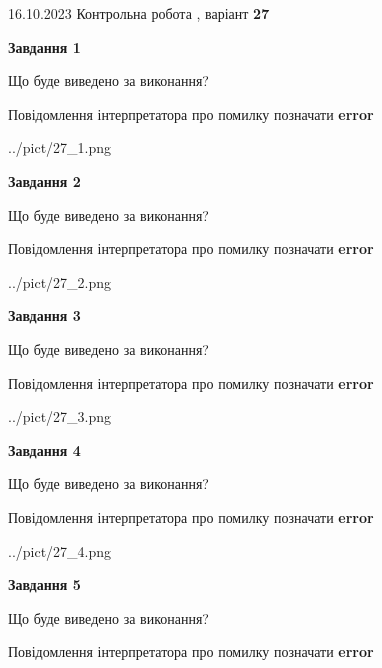 \documentclass[12pt, ukrainian]{article}
\begin{document}
{\Large{16.10.2023 Контрольна робота , варіант  \No \textbf { 27 }\par}}
{
\begin {large}
{\begin {center}\textbf{Завдання 1}\end {center}}\par
Що буде виведено за виконання? \par
Повідомлення інтерпретатора про помилку позначати \textbf{error}

\begin{center}
	{../pict/27_1.png}
\end{center}
\newpage

{\begin {center}\textbf{Завдання 2}\end {center}}\par
Що буде виведено за виконання? \par
Повідомлення інтерпретатора про помилку позначати \textbf{error}

\begin{center}
	{../pict/27_2.png}
\end{center}
\newpage

{\begin {center}\textbf{Завдання 3}\end {center}}\par
Що буде виведено за виконання? \par
Повідомлення інтерпретатора про помилку позначати \textbf{error}

\begin{center}
	{../pict/27_3.png}
\end{center}
\newpage

{\begin {center}\textbf{Завдання 4}\end {center}}\par
Що буде виведено за виконання? \par
Повідомлення інтерпретатора про помилку позначати \textbf{error}

\begin{center}
	{../pict/27_4.png}
\end{center}
\newpage

{\begin {center}\textbf{Завдання 5}\end {center}}\par
Що буде виведено за виконання? \par
Повідомлення інтерпретатора про помилку позначати \textbf{error}


\end{large}}
\end{document}
